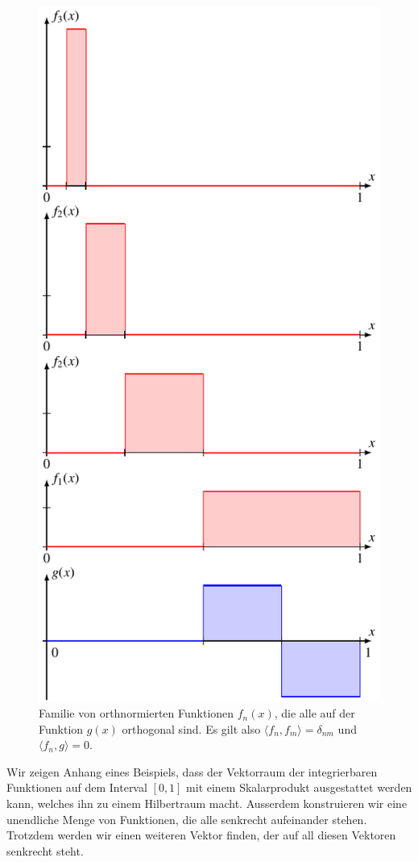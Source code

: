 \begin{beispiel}
\begin{figure}
\centering
\includegraphics{chapters/1-geometrie/images/l2orth.pdf}
\caption{Familie von orthnormierten Funktionen $f_n(x)$, die alle auf der
Funktion $g(x)$ orthogonal sind.
Es gilt also $\langle f_n,f_m\rangle = \delta_{nm}$ und
$\langle f_n,g\rangle=0$.
\label{l2orth}}
\end{figure}
Wir zeigen Anhang eines Beispiels, dass der Vektorraum  der integrierbaren
Funktionen auf dem Interval $[0,1]$ mit einem Skalarprodukt
ausgestattet werden kann, welches ihn zu einem Hilbertraum macht.
Ausserdem konstruieren wir eine unendliche Menge von Funktionen, die alle
senkrecht aufeinander stehen.
Trotzdem werden wir einen weiteren Vektor finden, der auf all diesen
Vektoren senkrecht steht.


\end{beispiel}
